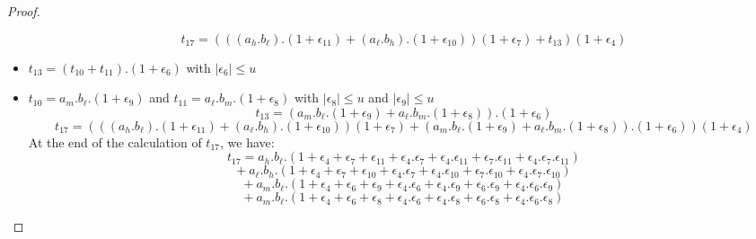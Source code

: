 \begin{proof}
\begin{itemize}
    $$t_{17} = (((a_h.b_{\ell}).(1+\epsilon_{11}) + (a_{\ell}.b_h).(1+\epsilon_{10}))(1+\epsilon_7) + t_{13})(1+\epsilon_4)$$
    \item $t_{13} = (t_{10} + t_{11}).(1+\epsilon_6)$ with $\lvert \epsilon_6 \rvert \le u$
    \item $t_{10} = a_m.b_{\ell}.(1+\epsilon_9)$ and $t_{11} = a_{\ell}.b_m.(1+\epsilon_8)$ with $\lvert \epsilon_8 \rvert \le u$ and $\lvert \epsilon_9 \rvert \le u$
    $$t_{13} = (a_m.b_{\ell}.(1+\epsilon_9) + a_{\ell}.b_m.(1+\epsilon_8)).(1+\epsilon_6)$$
    $$t_{17} = (((a_h.b_{\ell}).(1+\epsilon_{11}) + (a_{\ell}.b_h).(1+\epsilon_{10}))(1+\epsilon_7) + (a_m.b_{\ell}.(1+\epsilon_9) + a_{\ell}.b_m.(1+\epsilon_8)).(1+\epsilon_6))(1+\epsilon_4)$$
    At the end of the calculation of $t_{17}$, we have:\\
    $$t_{17} = a_h.b_{\ell}.(1 + \epsilon_4 + \epsilon_7 + \epsilon_{11} + 
    \epsilon_4.\epsilon_7 + \epsilon_4.\epsilon_{11} + \epsilon_7.\epsilon_{11} + 
    \epsilon_4.\epsilon_7.\epsilon_{11})$$
    $$ + \  a_{\ell}.b_h.(1 + \epsilon_4 + \epsilon_7 + \epsilon_{10} + \epsilon_4.\epsilon_7 + 
    \epsilon_4.\epsilon_{10} + \epsilon_7.\epsilon_{10} + \epsilon_4.\epsilon_7.\epsilon_{10})$$ 
    $$ + \   a_m.b_{\ell}.(1 + \epsilon_4 + \epsilon_6 + \epsilon_9 + 
    \epsilon_4.\epsilon_6 + \epsilon_4.\epsilon_9 + \epsilon_6.\epsilon_9 + 
    \epsilon_4.\epsilon_6.\epsilon_9) $$ 
    $$ + \  a_m.b_{\ell}.(1 + \epsilon_4 + \epsilon_6 + \epsilon_8 + 
    \epsilon_4.\epsilon_6 + \epsilon_4.\epsilon_8 + \epsilon_6.\epsilon_8 + 
    \epsilon_4.\epsilon_6.\epsilon_8)$$
    

\end{itemize}
\end{proof}
